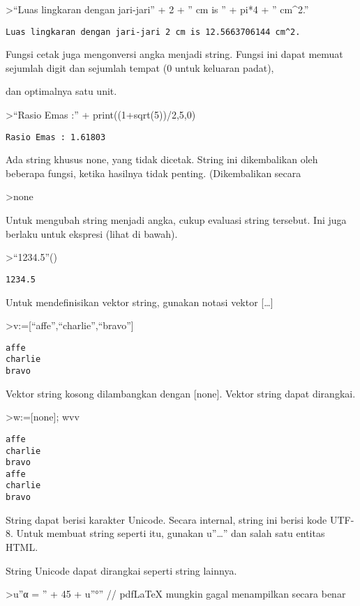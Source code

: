 \documentclass[
]{book}
\begin{document}
\textgreater{}``Luas lingkaran dengan jari-jari'' + 2 + '' cm is '' + pi*4 + '' cm\^{}2.''

\begin{verbatim}
Luas lingkaran dengan jari-jari 2 cm is 12.5663706144 cm^2.
\end{verbatim}

Fungsi cetak juga mengonversi angka menjadi string. Fungsi ini dapat memuat sejumlah digit dan sejumlah tempat (0 untuk keluaran padat),

dan optimalnya satu unit.

\textgreater{}``Rasio Emas :'' + print((1+sqrt(5))/2,5,0)

\begin{verbatim}
Rasio Emas : 1.61803
\end{verbatim}

Ada string khusus none, yang tidak dicetak. String ini dikembalikan oleh beberapa fungsi, ketika hasilnya tidak penting. (Dikembalikan secara

\textgreater none

Untuk mengubah string menjadi angka, cukup evaluasi string tersebut. Ini juga berlaku untuk ekspresi (lihat di bawah).

\textgreater{}``1234.5''()

\begin{verbatim}
1234.5
\end{verbatim}

Untuk mendefinisikan vektor string, gunakan notasi vektor {[}\ldots{]}

\textgreater v:={[}``affe'',``charlie'',``bravo''{]}

\begin{verbatim}
affe
charlie
bravo
\end{verbatim}

Vektor string kosong dilambangkan dengan {[}none{]}. Vektor string dapat dirangkai.

\textgreater w:={[}none{]}; w\textbar v\textbar v

\begin{verbatim}
affe
charlie
bravo
affe
charlie
bravo
\end{verbatim}

String dapat berisi karakter Unicode. Secara internal, string ini berisi kode UTF-8. Untuk membuat string seperti itu, gunakan u''\ldots'' dan salah satu entitas HTML.

String Unicode dapat dirangkai seperti string lainnya.

\textgreater u''α = '' + 45 + u''°'' // pdfLaTeX mungkin gagal menampilkan secara benar
\end{document}
